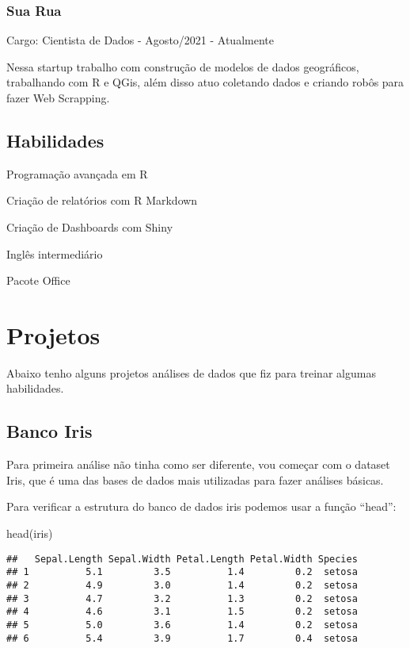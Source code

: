 \documentclass[
]{book}
\newenvironment{Shaded}{\begin{snugshade}}{\end{snugshade}}
\newcommand{\FunctionTok}[1]{\textcolor[rgb]{0.00,0.00,0.00}{#1}}
\newcommand{\NormalTok}[1]{#1}
\begin{document}
\hypertarget{sua-rua}{%
\subsection{Sua Rua}\label{sua-rua}}

Cargo: Cientista de Dados - Agosto/2021 - Atualmente

Nessa startup trabalho com construção de modelos de dados geográficos, trabalhando com R e QGis, além disso atuo coletando dados e criando robôs para fazer Web Scrapping.

\hypertarget{habilidades}{%
\section{Habilidades}\label{habilidades}}

Programação avançada em R

Criação de relatórios com R Markdown

Criação de Dashboards com Shiny

Inglês intermediário

Pacote Office

\hypertarget{projetos}{%
\chapter{Projetos}\label{projetos}}

Abaixo tenho alguns projetos análises de dados que fiz para treinar algumas habilidades.

\hypertarget{banco-iris}{%
\section{Banco Iris}\label{banco-iris}}

Para primeira análise não tinha como ser diferente, vou começar com o dataset Iris, que é uma das bases de dados mais utilizadas para fazer análises básicas.

Para verificar a estrutura do banco de dados iris podemos usar a função ``head'':

\begin{Shaded}
\begin{Highlighting}[]
\FunctionTok{head}\NormalTok{(iris)}
\end{Highlighting}
\end{Shaded}

\begin{verbatim}
##   Sepal.Length Sepal.Width Petal.Length Petal.Width Species
## 1          5.1         3.5          1.4         0.2  setosa
## 2          4.9         3.0          1.4         0.2  setosa
## 3          4.7         3.2          1.3         0.2  setosa
## 4          4.6         3.1          1.5         0.2  setosa
## 5          5.0         3.6          1.4         0.2  setosa
## 6          5.4         3.9          1.7         0.4  setosa
\end{verbatim}
\end{document}
